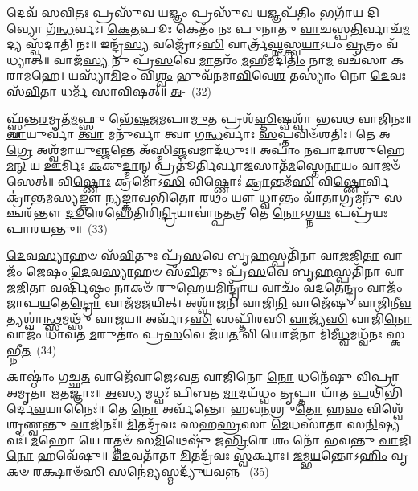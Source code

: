 {\anuvakamend[{𑌯𑌃 𑌸 \ul{𑌮𑌾}\-𑌶𑌿𑌷𑌂᳴ 𑌗𑍃𑌹𑌪\-\ul{𑌤} 𑌇𑌤𑍍𑌯𑌾᳴\-\ul{𑌹} 𑌯𑌸𑍍𑌯᳴ \ul{𑌪𑍁}\-𑌤𑍍𑌰𑍋 \ul{𑌵𑍍𑌰}\-𑌤\-\ul{𑌮𑍇}\-𑌵 𑌖\-\ul{𑌲𑍁} 𑌵𑍈 𑌚𑌤𑍁᳴𑌰𑍍𑌵𑌿𑍞𑌶𑌤𑌿𑌶𑍍𑌚}]}%

𑌦𑍇𑌵᳴ 𑌸𑌵𑌿\-\ul{𑌤𑌃} 𑌪𑍍𑌰𑌸𑍁᳴𑌵 \ul{𑌯}\-𑌜𑍍𑌞𑌂 𑌪𑍍𑌰𑌸𑍁᳴𑌵 \ul{𑌯}\-𑌜𑍍𑌞𑌪᳴\-\ul{𑌤𑌿𑌂} 𑌭𑌗𑌾᳴𑌯 \ul{𑌦𑌿}\-𑌵𑍍𑌯𑍋 𑌗᳴\-\ul{𑌨𑍍𑌧}\-𑌰𑍍𑌵𑌃। \ul{𑌕𑍇}\-\-\ul{𑌤}\-𑌪𑍂𑌃 𑌕𑍇𑌤𑌂᳴ 𑌨𑌃 𑌪𑍁𑌨𑌾𑌤𑍁 \ul{𑌵𑌾}\-𑌚𑌸𑍍𑌪\-\ul{𑌤𑌿}\-𑌰𑍍𑌵𑌾𑌚᳴\-\ul{𑌮}\-𑌦𑍍𑌯 𑌸𑍍𑌵᳴𑌦𑌾𑌤𑌿 𑌨𑌃॥ 𑌇𑌨𑍍𑌦𑍍𑌰᳴\-\ul{𑌸𑍍𑌯} 𑌵𑌜𑍍𑌰𑍋᳴\-𑌽\-\ul{𑌸𑌿} 𑌵𑌾𑌰𑍍𑌤𑍍𑌰᳴\-\ul{𑌘𑍍𑌨}\-𑌸𑍍𑌤𑍍𑌵\-\ul{𑌯𑌾}\-\-𑌽𑌯𑌂 \ul{𑌵𑍃}\-𑌤𑍍𑌰𑌂 𑌵᳴𑌧𑍍𑌯𑌾𑌤𑍍॥ 𑌵𑌾𑌜᳴\-\ul{𑌸𑍍𑌯} 𑌨𑍁 𑌪𑍍𑌰᳴\-\ul{𑌸}\-𑌵𑍇 \ul{𑌮𑌾}\-𑌤𑌰𑌂᳴ \ul{𑌮}\-𑌹𑍀𑌮𑌦𑌿᳴\-\ul{𑌤𑌿𑌂} 𑌨𑌾\-\ul{𑌮} 𑌵𑌚᳴𑌸𑌾 𑌕𑌰𑌾𑌮𑌹𑍇। 𑌯𑌸𑍍𑌯𑌾᳴\-\ul{𑌮𑌿}\-𑌦𑌂 𑌵𑌿\-\ul{𑌶𑍍𑌵𑌂} 𑌭𑍁𑌵᳴𑌨𑌮𑌾\-\ul{𑌵𑌿}\-𑌵𑍇\-\ul{𑌶} 𑌤𑌸𑍍𑌯𑌾𑌂॑ 𑌨𑍋 \ul{𑌦𑍇}\-𑌵𑌃 𑌸᳴\-\ul{𑌵𑌿}\-𑌤𑌾 𑌧𑌰𑍍𑌮᳴ 𑌸𑌾𑌵𑌿𑌷𑌤𑍍॥ \ul{𑌅}\--~(32)

𑌫𑍍𑌸𑍍𑌵᳴𑌨𑍍𑌤\-\ul{𑌰}\-𑌮𑍃𑌤᳴\-\ul{𑌮}\-𑌫𑍍𑌸𑍁 𑌭𑍇᳴\-\ul{𑌷}\-𑌜\-\ul{𑌮}\-𑌪𑌾\-\ul{𑌮𑍁}\-𑌤 𑌪𑍍𑌰𑌶᳴\-\ul{𑌸𑍍𑌤𑌿}\-𑌷𑍍𑌵𑌶𑍍𑌵𑌾᳴ 𑌭𑌵𑌥 𑌵𑌾𑌜𑌿𑌨𑌃॥ \ul{𑌵𑌾}\-𑌯𑍁𑌰𑍍𑌵𑌾॑ \ul{𑌤𑍍𑌵𑌾} 𑌮𑌨𑍁᳴𑌰𑍍𑌵𑌾 𑌤𑍍𑌵𑌾 𑌗\-\ul{𑌨𑍍𑌧}\-𑌰𑍍𑌵𑌾𑌃 \ul{𑌸}\-𑌪𑍍𑌤𑌵𑌿𑍞᳴𑌶𑌤𑌿𑌃। 𑌤𑍇 𑌅\-\ul{𑌗𑍍𑌰𑍇} 𑌅𑌶𑍍𑌵᳴𑌮𑌾𑌯𑍁\-\ul{𑌞𑍍𑌜}\-𑌨𑍍𑌤𑍇 𑌅᳴𑌸𑍍𑌮𑌿\-\ul{𑌞𑍍𑌜}\-𑌵𑌮𑌾𑌦᳴𑌧𑍁𑌃॥ 𑌅𑌪𑌾𑌂॑ 𑌨𑌪𑌾𑌦𑌾𑌶𑍁𑌹𑍇\-\ul{𑌮}\-\-\ul{𑌨𑍍} 𑌯 \ul{𑌊}\-𑌰𑍍𑌮𑌿𑌃 \ul{𑌕}\-𑌕𑍁\-\ul{𑌦𑍍𑌮𑌾}\-𑌨𑍍 𑌪𑍍𑌰𑌤𑍂॑𑌰𑍍𑌤𑌿𑌰𑍍𑌵𑌾\-\ul{𑌜}\-𑌸𑌾𑌤᳴\-\ul{𑌮}\-𑌸𑍍𑌤𑍇\-\ul{𑌨𑌾}\-𑌯𑌂 𑌵𑌾𑌜𑍞᳴ 𑌸𑍇𑌤𑍍॥ 𑌵𑌿\-\ul{𑌷𑍍𑌣𑍋𑌃} 𑌕𑍍𑌰𑌮𑍋᳴\-𑌽\-\ul{𑌸𑌿} 𑌵𑌿𑌷𑍍𑌣𑍋𑌃॑ \ul{𑌕𑍍𑌰𑌾}\-𑌨𑍍𑌤𑌮᳴\-\ul{𑌸𑌿} 𑌵𑌿\-\ul{𑌷𑍍𑌣𑍋}\-𑌰𑍍𑌵𑌿𑌕𑍍𑌰𑌾॑𑌨𑍍𑌤𑌮\-\ul{𑌸𑍍𑌯}\-𑌙𑍍𑌕𑍗 \ul{𑌨𑍍𑌯}\-𑌙𑍍𑌕𑌾\-\ul{𑌵}\-𑌭𑌿\-\ul{𑌤𑍋} 𑌰\-\ul{𑌥𑌂} 𑌯𑍗 \ul{𑌧𑍍𑌵𑌾}\-𑌨𑍍𑌤𑌂 𑌵𑌾᳴\-\ul{𑌤𑌾}\-𑌗𑍍𑌰𑌮𑌨𑍁᳴ \ul{𑌸}\-𑌞𑍍𑌚𑌰᳴𑌨𑍍𑌤𑍗 \ul{𑌦𑍂}\-𑌰𑍇𑌹𑍇᳴𑌤𑌿𑌰𑌿\-\ul{𑌨𑍍𑌦𑍍𑌰𑌿}\-𑌯𑌾𑌵𑌾॑𑌨𑍍𑌪\-\ul{𑌤}\-𑌤𑍍𑌰𑍀 𑌤𑍇 \ul{𑌨𑍋}\-\-𑌽𑌗𑍍𑌨\-\ul{𑌯𑌃} 𑌪𑌪𑍍𑌰᳴𑌯𑌃 𑌪𑌾𑌰𑌯𑌨𑍍𑌤𑍁॥~(33)

{\anuvakamend[{\-\ul{𑌅}\-𑌫𑍍𑌸𑍁 \ul{𑌨𑍍𑌯}\-𑌙𑍍𑌕𑍗 𑌪𑌞𑍍𑌚᳴𑌦𑌶 𑌚}]}%

\-\ul{𑌦𑍇}\-𑌵\-\ul{𑌸𑍍𑌯𑌾}\-𑌹𑍞 𑌸᳴\-\ul{𑌵𑌿}\-𑌤𑍁𑌃 𑌪𑍍𑌰᳴\-\ul{𑌸}\-𑌵𑍇 𑌬𑍃\-\ul{𑌹}\-𑌸𑍍𑌪𑌤𑌿᳴𑌨𑌾 𑌵𑌾\-\ul{𑌜}\-𑌜𑌿\-\ul{𑌤𑌾} 𑌵𑌾𑌜𑌂᳴ 𑌜𑍇𑌷𑌂 \ul{𑌦𑍇}\-𑌵\-\ul{𑌸𑍍𑌯𑌾}\-𑌹𑍞 𑌸᳴\-\ul{𑌵𑌿}\-𑌤𑍁𑌃 𑌪𑍍𑌰᳴\-\ul{𑌸}\-𑌵𑍇 𑌬𑍃\-\ul{𑌹}\-𑌸𑍍𑌪𑌤𑌿᳴𑌨𑌾 𑌵𑌾\-\ul{𑌜}\-𑌜𑌿\-\ul{𑌤𑌾} 𑌵𑌰𑍍\mbox{}𑌷𑌿᳴\-\ul{𑌷𑍍𑌠𑌂} 𑌨𑌾𑌕𑍞᳴ 𑌰𑍁𑌹𑍇\-\ul{𑌯}\-𑌮𑌿𑌨𑍍𑌦𑍍𑌰𑌾᳴\-\ul{𑌯} 𑌵𑌾𑌚𑌂᳴ 𑌵\-\ul{𑌦}\-𑌤𑍇\-\ul{𑌨𑍍𑌦𑍍𑌰𑌂} 𑌵𑌾𑌜𑌂᳴ 𑌜𑌾𑌪\-\ul{𑌯}\-𑌤𑍇\-\ul{𑌨𑍍𑌦𑍍𑌰𑍋} 𑌵𑌾𑌜᳴𑌮𑌜𑌯𑌿𑌤𑍍। 𑌅𑌶𑍍𑌵𑌾᳴𑌜𑌨𑌿 𑌵𑌾𑌜𑌿\-\ul{𑌨𑌿} 𑌵𑌾𑌜𑍇᳴𑌷𑍁 𑌵𑌾𑌜𑌿𑌨𑍀\-\ul{𑌵}\-𑌤𑍍𑌯𑌶𑍍𑌵𑌾॑\-\ul{𑌨𑍍𑌥𑍍𑌸}\-𑌮𑌥𑍍𑌸𑍁᳴ 𑌵𑌾𑌜𑌯॥ 𑌅𑌰𑍍𑌵𑌾᳴𑌽\-\ul{𑌸𑌿} 𑌸𑌪𑍍𑌤𑌿᳴𑌰𑌸𑌿 \ul{𑌵𑌾}\-𑌜𑍍𑌯᳴\-\ul{𑌸𑌿} 𑌵𑌾𑌜𑌿᳴\-\ul{𑌨𑍋} 𑌵𑌾𑌜𑌂᳴ 𑌧𑌾𑌵𑌤 \ul{𑌮}\-𑌰𑍁𑌤𑌾𑌂॑ 𑌪𑍍𑌰\-\ul{𑌸}\-𑌵𑍇 𑌜᳴𑌯\-\ul{𑌤} 𑌵𑌿 𑌯𑍋𑌜᳴𑌨𑌾 𑌮𑌿𑌮𑍀\-\ul{𑌧𑍍𑌵}\-𑌮𑌧𑍍𑌵᳴𑌨𑌃 𑌸𑍍𑌕𑌭𑍍𑌨𑍀\-\ul{𑌤}\-~(34)

𑌕𑌾𑌷𑍍𑌠𑌾𑌂॑ 𑌗𑌚𑍍𑌛\-\ul{𑌤} 𑌵𑌾𑌜𑍇᳴𑌵𑌾𑌜𑍇\-𑌽𑌵𑌤 𑌵𑌾𑌜𑌿𑌨𑍋 \ul{𑌨𑍋} 𑌧𑌨𑍇᳴𑌷𑍁 𑌵𑌿𑌪𑍍𑌰𑌾 𑌅𑌮𑍃𑌤𑌾 𑌋𑌤𑌜𑍍𑌞𑌾𑌃॥ \ul{𑌅}\-𑌸𑍍𑌯 𑌮𑌧𑍍𑌵𑌃᳴ 𑌪𑌿𑌬𑌤 \ul{𑌮𑌾}\-𑌦𑌯᳴𑌧𑍍𑌵𑌂 \ul{𑌤𑍃}\-𑌪𑍍𑌤𑌾 𑌯𑌾᳴𑌤 \ul{𑌪}\-𑌥𑌿𑌭𑌿᳴𑌰𑍍𑌦𑍇\-\ul{𑌵}\-𑌯𑌾𑌨𑍈𑌃॑॥ 𑌤𑍇 \ul{𑌨𑍋} 𑌅𑌰𑍍𑌵᳴𑌨𑍍𑌤𑍋 𑌹𑌵\-\ul{𑌨}\-𑌶𑍍𑌰𑍁\-\ul{𑌤𑍋} 𑌹\-\ul{𑌵𑌂} 𑌵𑌿𑌶𑍍𑌵𑍇᳴ 𑌶𑍃𑌣𑍍𑌵𑌨𑍍𑌤𑍁 \ul{𑌵𑌾}\-𑌜𑌿𑌨𑌃᳴॥ \ul{𑌮𑌿}\-𑌤𑌦𑍍𑌰᳴𑌵𑌃 𑌸𑌹\-\ul{𑌸𑍍𑌰}\-𑌸𑌾 \ul{𑌮𑍇}\-𑌧𑌸𑌾᳴𑌤𑌾 𑌸\-\ul{𑌨𑌿}\-𑌷𑍍𑌯𑌵𑌃᳴। \ul{𑌮}\-𑌹𑍋 𑌯𑍇 𑌰𑌤𑍍𑌨𑍞᳴ 𑌸\-\ul{𑌮𑌿}\-𑌥𑍇𑌷𑍁᳴ 𑌜\-\ul{𑌭𑍍𑌰𑌿}\-𑌰𑍇 𑌶𑌂 𑌨𑍋᳴ 𑌭𑌵𑌨𑍍𑌤𑍁 \ul{𑌵𑌾}\-𑌜𑌿\-\ul{𑌨𑍋} 𑌹𑌵𑍇᳴𑌷𑍁॥ \ul{𑌦𑍇}\-𑌵𑌤𑌾᳴𑌤𑌾 \ul{𑌮𑌿}\-𑌤𑌦𑍍𑌰᳴𑌵𑌃 \ul{𑌸𑍍𑌵}\-𑌰𑍍𑌕𑌾𑌃। \ul{𑌜}\-𑌮𑍍𑌭\-\ul{𑌯}\-𑌨𑍍𑌤𑍋\-𑌽\-\ul{𑌹𑌿𑌂} 𑌵𑍃\-\ul{𑌕}\-\-\ul{𑍞} 𑌰𑌕𑍍𑌷𑌾𑍞᳴\-\ul{𑌸𑌿} 𑌸𑌨𑍇॑\-\ul{𑌮𑍍𑌯}\-𑌸𑍍𑌮𑌦𑍍𑌯𑍁᳴𑌯\-\ul{𑌵}\-𑌨𑍍𑌨-~(35)


